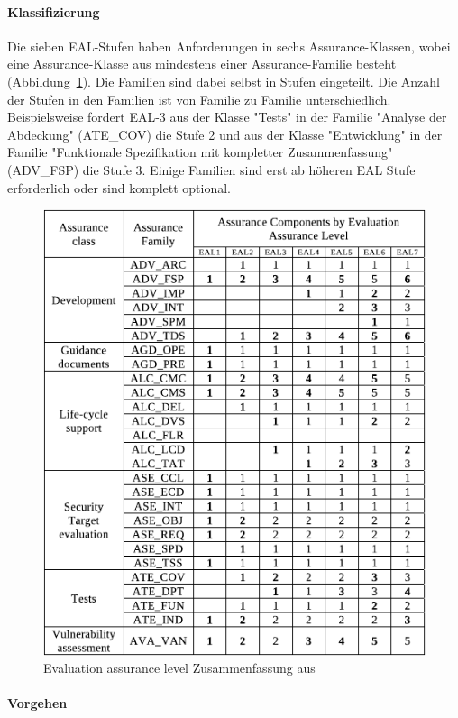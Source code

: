 \documentclass[11pt,a4paper]{report}
\begin{document}
\paragraph{Klassifizierung}

Die sieben EAL-Stufen haben Anforderungen in sechs Assurance-Klassen, wobei eine Assurance-Klasse aus mindestens einer Assurance-Familie besteht (Abbildung~\ref{fig:eal_sum}). Die Familien sind dabei selbst in Stufen eingeteilt. Die Anzahl der Stufen in den Familien ist von Familie zu Familie unterschiedlich. Beispielsweise fordert EAL-3 aus der Klasse "Tests" in der Familie "Analyse der Abdeckung" (ATE\_COV) die Stufe 2 und aus der Klasse "Entwicklung" in der Familie "Funktionale Spezifikation mit kompletter Zusammenfassung" (ADV\_FSP) die Stufe 3. Einige Familien sind erst ab höheren EAL Stufe erforderlich oder sind komplett optional. 

\begin{figure}[htbp]
\centering
\includegraphics[scale=1]{images/cc_eal_table.pdf}
\caption[]{Evaluation assurance level Zusammenfassung aus \cite{bsi_ccguide}}
\label{fig:eal_sum}
\end{figure}

\paragraph{Vorgehen}
\end{document}

